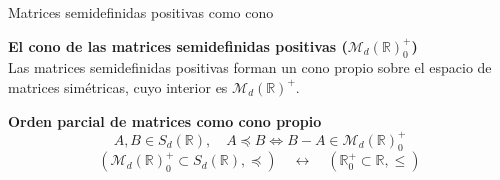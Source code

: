 \documentclass[10pt, compress]{beamer}
\newcommand\R{\mathbb{R}}
\begin{document}
\begin{frame}[shrink]{Matrices semidefinidas positivas como cono}
  \begin{tcolorbox}[colback=ChetwodeBlue!10,colframe=ChetwodeBlue!60]
    \begin{center}
      {\color{TurkishRose} \small\textbf{El cono de las matrices semidefinidas positivas ($\mathcal{M}_d(\R)^+_0$)}} \\
      Las matrices semidefinidas positivas forman un cono propio sobre el espacio de matrices simétricas, cuyo interior es $\mathcal{M}_d(\R)^+$.
    \end{center}
  \end{tcolorbox}

  \begin{tcolorbox}[colback=ChetwodeBlue!10,colframe=ChetwodeBlue!60]
    \begin{center}
      {\color{TurkishRose} \small\textbf{Orden parcial de matrices como cono propio}}
      \[A, B \in S_d(\R), \quad A \preceq B \iff B - A \in \mathcal{M}_d(\R)^+_0  \]
      \[ \left(\mathcal{M}_d(\R)^+_0 \subset S_d(\R), \preceq \right) \quad \longleftrightarrow \quad \left( \R^+_0 \subset \R , \le \right)\]
    \end{center}
  \end{tcolorbox}

\end{frame}
\end{document}
